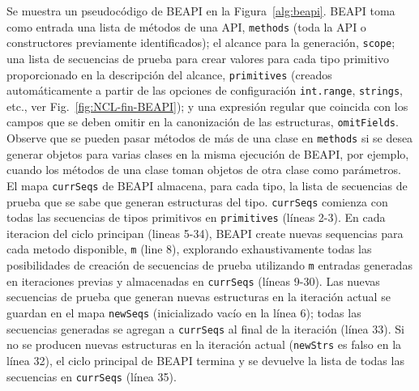 Se muestra un pseudocódigo de \textsf{BEAPI} en la Figura~\ref{alg:beapi}. \textsf{BEAPI} toma como entrada una lista de métodos de una API, \texttt{methods} (toda la API o constructores previamente identificados); el alcance para la generación, \texttt{scope}; una lista de secuencias de prueba para crear valores para cada tipo primitivo proporcionado en la descripción del alcance, \texttt{primitives} (creados automáticamente a partir de las opciones de configuración \texttt{int.range}, \texttt{strings}, etc., ver Fig.~\ref{fig:NCL-fin-BEAPI}); y una expresión regular que coincida con los campos que se deben omitir en la canonización de las estructuras, \texttt{omitFields}. Observe que se pueden pasar métodos de más de una clase en \texttt{methods} si se desea generar objetos para varias clases en la misma ejecución de \textsf{BEAPI}, por ejemplo, cuando los métodos de una clase toman objetos de otra clase como parámetros. El mapa \texttt{currSeqs} de \textsf{BEAPI} almacena, para cada tipo, la lista de secuencias de prueba que se sabe que generan estructuras del tipo. \texttt{currSeqs} comienza con todas las secuencias de tipos primitivos en \texttt{primitives} (líneas 2-3). En cada iteracion del ciclo principan (lineas 5-34),  \textsf{BEAPI} create nuevas sequencias para cada metodo disponible, \texttt{m} (line 8),
explorando exhaustivamente todas las posibilidades de creación de secuencias de prueba utilizando \texttt{m} entradas generadas en iteraciones previas y almacenadas en \texttt{currSeqs} (líneas 9-30). Las nuevas secuencias de prueba que generan nuevas estructuras en la iteración actual se guardan en el mapa \texttt{newSeqs} (inicializado vacío en la línea 6); todas las secuencias generadas se agregan a \texttt{currSeqs} al final de la iteración (línea 33). Si no se producen nuevas estructuras en la iteración actual (\texttt{newStrs} es falso en la línea 32), el ciclo principal de \textsf{BEAPI} termina y se devuelve la lista de todas las secuencias en \texttt{currSeqs} (línea 35).

